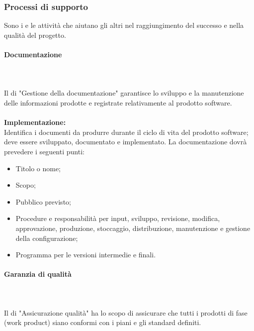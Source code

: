 \subsubsection{Processi di supporto}
Sono i  e le attività che aiutano gli altri  nel raggiungimento del successo e nella qualità del progetto.

\paragraph{Documentazione}\mbox{}\\ \\
Il  di "Gestione della documentazione" garantisce lo sviluppo e la manutenzione delle informazioni prodotte e registrate relativamente al prodotto software. \\ \\
\textbf{Implementazione:} \\ 
Identifica i documenti da produrre durante il ciclo di vita del prodotto software;
deve essere sviluppato, documentato e implementato. La documentazione dovrà prevedere i seguenti punti: 
\begin{itemize}
    \item Titolo o nome;
    \item Scopo;
    \item Pubblico previsto;
    \item Procedure e responsabilità per input, sviluppo, revisione, modifica, approvazione, produzione, stoccaggio, distribuzione, manutenzione e gestione della configurazione;
    \item Programma per le versioni intermedie e finali.
\end{itemize}

\paragraph{Garanzia di qualità}\mbox{}\\ \\
Il  di "Assicurazione qualità" ha lo scopo di assicurare che tutti i prodotti di fase (work product) siano conformi con i piani e gli standard definiti.
